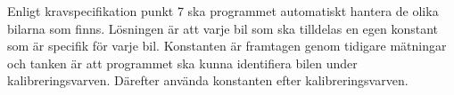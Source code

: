 Enligt kravspecifikation punkt 7 ska programmet automatiskt hantera de olika bilarna som finns. Lösningen är att varje bil som ska tilldelas en egen konstant som är specifik för varje bil. Konstanten är framtagen genom tidigare mätningar och tanken är att programmet ska kunna identifiera bilen under kalibreringsvarven. Därefter använda konstanten efter kalibreringsvarven. 
